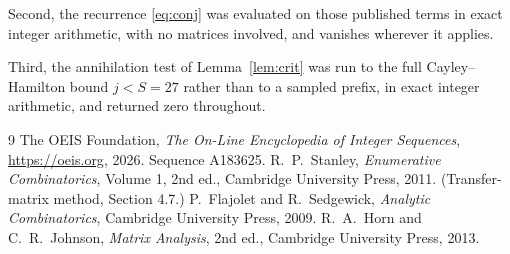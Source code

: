\documentclass[11pt,a4paper]{article}
\theoremstyle{plain}
\theoremstyle{definition}
\begin{document}
Second, the recurrence \eqref{eq:conj} was evaluated on those published terms in exact
integer arithmetic, with no matrices involved, and vanishes wherever it applies.

Third, the annihilation test of Lemma~\ref{lem:crit} was run to the full Cayley--Hamilton
bound $j<S=27$ rather than to a sampled prefix, in exact integer arithmetic, and returned
zero throughout.

\begin{thebibliography}{9}
 The OEIS Foundation, \emph{The On-Line Encyclopedia of Integer
Sequences}, \url{https://oeis.org}, 2026. Sequence A183625.
 R.~P.~Stanley, \emph{Enumerative Combinatorics}, Volume 1, 2nd ed.,
Cambridge University Press, 2011. (Transfer-matrix method, Section 4.7.)
 P.~Flajolet and R.~Sedgewick, \emph{Analytic Combinatorics}, Cambridge
University Press, 2009.
 R.~A.~Horn and C.~R.~Johnson, \emph{Matrix Analysis}, 2nd ed., Cambridge
University Press, 2013.
\end{thebibliography}
\end{document}
